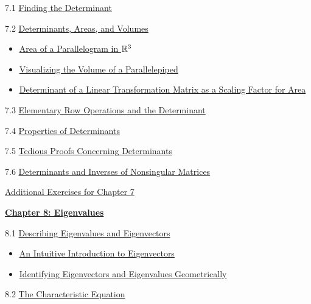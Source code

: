 \documentclass{ximera}
\begin{document}
7.1	\href{https://ximera.osu.edu/linearalgebradzv3/LinearAlgebraInteractiveIntro/DET-0010/main}{Finding the Determinant}
	
7.2	\href{https://ximera.osu.edu/linearalgebradzv3/LinearAlgebraInteractiveIntro/DET-0070/main}{Determinants, Areas, and Volumes}
\begin{itemize}
    \item 
    \href{https://www.geogebra.org/m/g7g6kjqm}{Area of a Parallelogram in $\mathbb{R}^3$}
    \item 
    \href{https://www.geogebra.org/classic/tfuzeqwr}{Visualizing the Volume of a Parallelepiped}
    \item
    \href{https://www.geogebra.org/m/nr8jsz4w}{Determinant of a Linear Transformation Matrix as a Scaling Factor for Area}
\end{itemize}
	
7.3	\href{https://ximera.osu.edu/linearalgebradzv3/LinearAlgebraInteractiveIntro/DET-0030/main}{Elementary Row Operations and the Determinant}
	
7.4	\href{https://ximera.osu.edu/linearalgebradzv3/LinearAlgebraInteractiveIntro/DET-0040/main}{Properties of Determinants}
	
7.5	\href{https://ximera.osu.edu/linearalgebradzv3/LinearAlgebraInteractiveIntro/DET-0050/main}{Tedious Proofs Concerning Determinants}
	
7.6	\href{https://ximera.osu.edu/linearalgebradzv3/LinearAlgebraInteractiveIntro/DET-0060/main}{Determinants and Inverses of Nonsingular Matrices}
	
\href{https://ximera.osu.edu/linearalgebradzv3/LinearAlgebraInteractiveIntro/SUPX-0070/main}{Additional Exercises for Chapter 7}
	
\href{https://ximera.osu.edu/linearalgebradzv3/LinearAlgebraInteractiveIntro/XLAChapter_eigenvalues/main}{\textbf{Chapter 8: Eigenvalues}}
	
8.1	\href{https://ximera.osu.edu/linearalgebradzv3/LinearAlgebraInteractiveIntro/EIG-0010/main}{Describing Eigenvalues and Eigenvectors}
\begin{itemize}
    \item 
    \href{https://www.geogebra.org/m/ub4kqvmz}{An Intuitive Introduction to Eigenvectors}
    \item
    \href{https://www.geogebra.org/m/vd3fydmg}{Identifying Eigenvectors and Eigenvalues Geometrically}
\end{itemize}
	
8.2	\href{https://ximera.osu.edu/linearalgebradzv3/LinearAlgebraInteractiveIntro/EIG-0020/main}{The Characteristic Equation}
	
\end{document}
